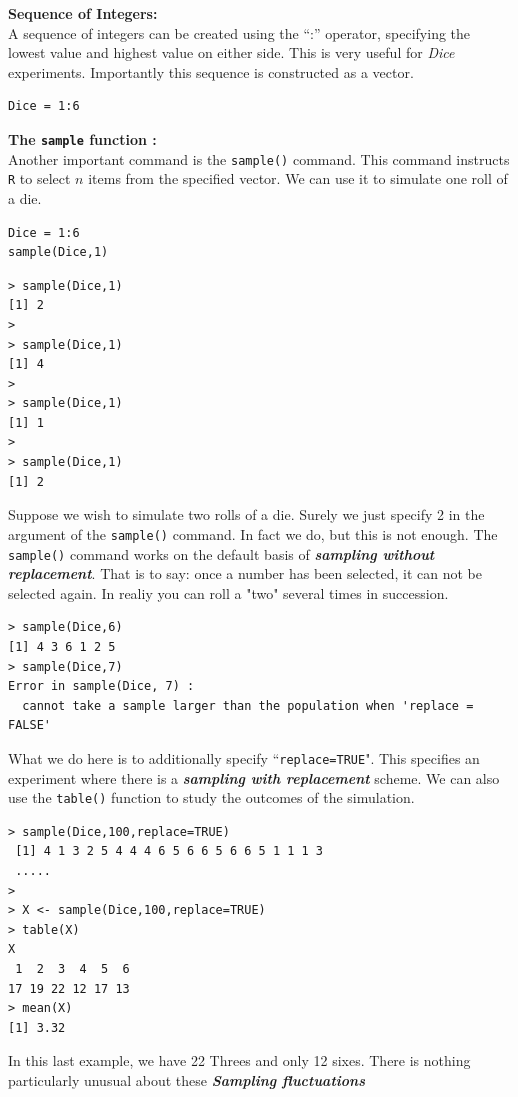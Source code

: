 \documentclass[11pt]{article} %
\begin{document}
\textbf{Sequence of Integers:}\\
A sequence of integers can be created using the “:” operator, specifying the lowest value and highest value on either side. This is very useful for \textit{Dice} experiments. Importantly this sequence is constructed as a vector.
\begin{framed}
\begin{verbatim}
Dice = 1:6
\end{verbatim}
\end{framed}
\textbf{The \texttt{sample} function :}\\
Another important command is the \texttt{sample()} command. This command instructs \texttt{R} to select $n$ items from the specified vector. We can use it to simulate one roll of a die.
\begin{framed}
\begin{verbatim}
Dice = 1:6
sample(Dice,1)
\end{verbatim}
\end{framed}
\begin{verbatim}
> sample(Dice,1)
[1] 2 
> 
> sample(Dice,1)
[1] 4 
>
> sample(Dice,1)
[1] 1
> 
> sample(Dice,1)
[1] 2
\end{verbatim}

\noindent Suppose we wish to simulate two rolls of a die. Surely we just specify 2 in the argument of the \texttt{sample()} command. In fact we do, but this is not enough.
The \texttt{sample()} command works on the default basis of \textbf{\textit{sampling without replacement}}. That is to say: once a number has been selected, it can not be selected again. In realiy you can roll a "two" several times in succession.
\begin{verbatim}
> sample(Dice,6)
[1] 4 3 6 1 2 5
> sample(Dice,7)
Error in sample(Dice, 7) : 
  cannot take a sample larger than the population when 'replace = FALSE'
\end{verbatim}
What we do here is to additionally specify ``\texttt{replace=TRUE}". This specifies an experiment where there is a \textbf{\textit{sampling with replacement}} scheme. We can also use the \texttt{table()} function to study the outcomes of the simulation.
\begin{verbatim}
> sample(Dice,100,replace=TRUE)
 [1] 4 1 3 2 5 4 4 4 6 5 6 6 5 6 6 5 1 1 1 3
 .....
>
> X <- sample(Dice,100,replace=TRUE)
> table(X)
X
 1  2  3  4  5  6 
17 19 22 12 17 13 
> mean(X)
[1] 3.32
\end{verbatim}
In this last example, we have 22 Threes and only 12 sixes. There is nothing particularly unusual about these 
\textbf{\textit{Sampling fluctuations}}
\end{document}
